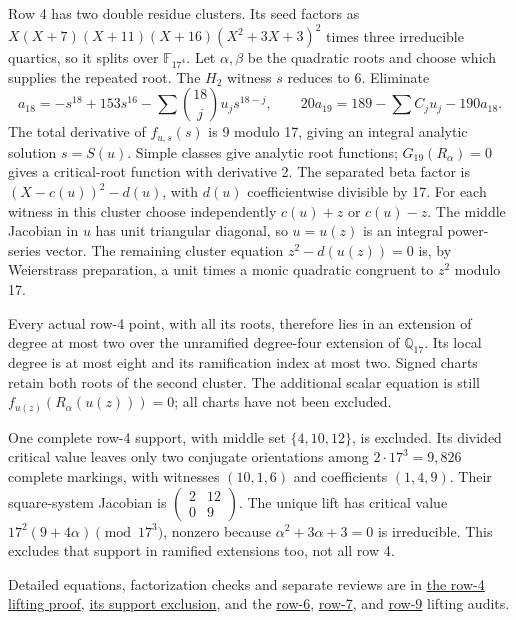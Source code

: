 \documentclass[
  british,
  10pt,
]{article}
\begin{document}
Row 4 has two double residue clusters. Its seed factors as
\(X(X+7)(X+11)(X+16)(X^2+3X+3)^2\) times three irreducible quartics, so
it splits over \(\mathbb F_{17^4}\). Let \(\alpha,\beta\) be the
quadratic roots and choose which supplies the repeated root. The \(H_2\)
witness \(s\) reduces to 6. Eliminate \[
 a_{18}=-s^{18}+153s^{16}-\sum\binom{18}{j}u_js^{18-j},\qquad
 20a_{19}=189-\sum C_ju_j-190a_{18}.
\] The total derivative of \(f_{u,s}(s)\) is 9 modulo 17, giving an
integral analytic solution \(s=S(u)\). Simple classes give analytic root
functions; \(G_{19}(R_\alpha)=0\) gives a critical-root function with
derivative 2. The separated beta factor is \((X-c(u))^2-d(u)\), with
\(d(u)\) coefficientwise divisible by 17. For each witness in this
cluster choose independently \(c(u)+z\) or \(c(u)-z\). The middle
Jacobian in \(u\) has unit triangular diagonal, so \(u=u(z)\) is an
integral power-series vector. The remaining cluster equation
\(z^2-d(u(z))=0\) is, by Weierstrass preparation, a unit times a monic
quadratic congruent to \(z^2\) modulo 17.

Every actual row-4 point, with all its roots, therefore lies in an
extension of degree at most two over the unramified degree-four
extension of \(\mathbb Q_{17}\). Its local degree is at most eight and
its ramification index at most two. Signed charts retain both roots of
the second cluster. The additional scalar equation is still
\(f_{u(z)}(R_\alpha(u(z)))=0\); all charts have not been excluded.

One complete row-4 support, with middle set \(\{4,10,12\}\), is
excluded. Its divided critical value leaves only two conjugate
orientations among \(2\cdot17^3=9,826\) complete markings, with
witnesses \((10,1,6)\) and coefficients \((1,4,9)\). Their square-system
Jacobian is
\(\left(\begin{smallmatrix}2&12\\0&9\end{smallmatrix}\right)\). The
unique lift has critical value \(17^2(9+4\alpha)\pmod{17^3}\), nonzero
because \(\alpha^2+3\alpha+3=0\) is irreducible. This excludes that
support in ramified extensions too, not all row 4.

Detailed equations, factorization checks and separate reviews are in
\href{evidence/full/tame17/ROW4_QUADRATIC_LIFTING.md}{the row-4 lifting
proof},
\href{evidence/full/tame17/ROW4_SMALLEST_SUPPORT_EXCLUSION.md}{its
support exclusion}, and the
\href{evidence/full/tame17/ROW6_ETALE_AUDIT.md}{row-6},
\href{evidence/full/tame17/ROW7_ETALE_AUDIT.md}{row-7}, and
\href{evidence/full/tame17/ROW9_ETALE_AUDIT.md}{row-9} lifting audits.
\end{document}
